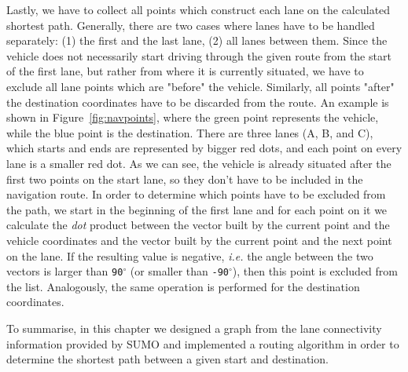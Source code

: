 Lastly, we have to collect all points which construct each lane on the calculated shortest path. Generally, there are two cases where lanes have to be handled separately: (1) the first and the last lane, (2) all lanes between them. Since the vehicle does not necessarily start driving through the given route from the start of the first lane, but rather from where it is currently situated, we have to exclude all lane points which are "before" the vehicle. Similarly, all points "after" the destination coordinates have to be discarded from the route. An example is shown in Figure~\ref{fig:navpoints}, where the green point represents the vehicle, while the blue point is the destination. There are three lanes (A, B, and C), which starts and ends are represented by bigger red dots, and each point on every lane is a smaller red dot. As we can see, the vehicle is already situated after the first two points on the start lane, so they don't have to be included in the navigation route. In order to determine which points have to be excluded from the path, we start in the beginning of the first lane and for each point on it we calculate the \emph{dot} product between the vector built by the current point and the vehicle coordinates and the vector built by the current point and the next point on the lane. If the resulting value is negative, \emph{i.e.} the angle between the two vectors is larger than \texttt{90$^{\circ}$} (or smaller than \texttt{-90$^{\circ}$}), then this point is excluded from the list. Analogously, the same operation is performed for the destination coordinates.

To summarise, in this chapter we designed a graph from the lane connectivity information provided by SUMO and implemented a routing algorithm in order to determine the shortest path between a given start and destination. 
